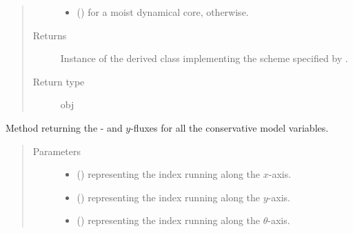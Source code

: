 \documentclass[letterpaper,10pt,english]{sphinxmanual}
\begin{document}
\begin{fulllineitems}
\begin{fulllineitems}
\begin{quote}
\begin{description}
\begin{itemize}
\item {} 
 () \textendash{}  for a moist dynamical core,  otherwise.

\end{itemize}

\item[{Returns}] \leavevmode
Instance of the derived class implementing the scheme specified by .

\item[{Return type}] \leavevmode
obj

\end{description}\end{quote}

\end{fulllineitems}


\begin{fulllineitems}
\label{\detokenize{api:dycore.flux_isentropic.FluxIsentropic.get_horizontal_fluxes}}
Method returning the - and \(y\)-fluxes
for all the conservative model variables.
\begin{quote}\begin{description}
\item[{Parameters}] \leavevmode\begin{itemize}
\item {} 
 () \textendash{}  representing the index running along the \(x\)-axis.

\item {} 
 () \textendash{}  representing the index running along the \(y\)-axis.

\item {} 
 () \textendash{}  representing the index running along the \(\theta\)-axis.


\end{itemize}
\end{description}
\end{quote}
\end{fulllineitems}
\end{fulllineitems}
\end{document}
